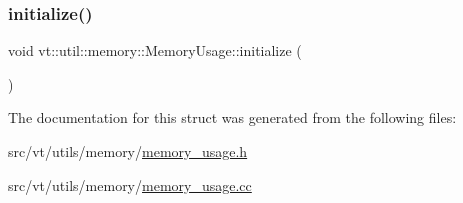\mbox{\label{structvt_1_1util_1_1memory_1_1_memory_usage_abcbd3fd9c8f717b98730ca24c57b8cb1}} 
\subsubsection{\texorpdfstring{initialize()}{initialize()}}
{\footnotesize\ttfamily void vt\+::util\+::memory\+::\+Memory\+Usage\+::initialize (\begin{DoxyParamCaption}{ }\end{DoxyParamCaption})\hspace{0.3cm}{\ttfamily [static]}}



The documentation for this struct was generated from the following files\+:\begin{DoxyCompactItemize}
\item 
src/vt/utils/memory/\hyperlink{memory__usage_8h}{memory\+\_\+usage.\+h}\item 
src/vt/utils/memory/\hyperlink{memory__usage_8cc}{memory\+\_\+usage.\+cc}\end{DoxyCompactItemize}
